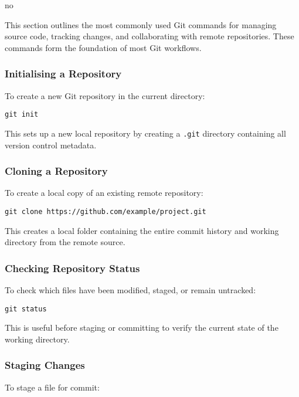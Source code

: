 no\documentclass{article}
\begin{document}
This section outlines the most commonly used Git commands for managing source code, tracking changes, and collaborating with remote repositories. These commands form the foundation of most Git workflows.

\subsubsection{Initialising a Repository}

To create a new Git repository in the current directory:

\begin{verbatim}
git init
\end{verbatim}

\noindent This sets up a new local repository by creating a \texttt{.git} directory containing all version control metadata.

\subsubsection{Cloning a Repository}

To create a local copy of an existing remote repository:

\begin{verbatim}
git clone https://github.com/example/project.git
\end{verbatim}

\noindent This creates a local folder containing the entire commit history and working directory from the remote source.

\subsubsection{Checking Repository Status}

To check which files have been modified, staged, or remain untracked:

\begin{verbatim}
git status
\end{verbatim}

\noindent This is useful before staging or committing to verify the current state of the working directory.

\subsubsection{Staging Changes}

To stage a file for commit:
\end{document}
